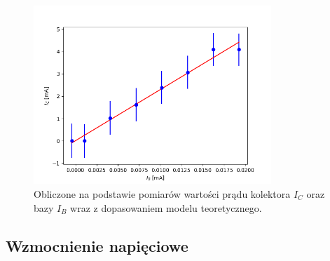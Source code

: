 \documentclass[10pt,a4paper]{article}
\begin{document}
\begin{figure}[ht!]	
	\begin{center}
		\includegraphics[width = 0.8\textwidth]{Figure_1.png}
		\caption{Obliczone na podstawie pomiarów wartości prądu kolektora $I_C$ oraz bazy $I_B$ wraz z dopasowaniem modelu teoretycznego.}
		\label{fig_1}
	\end{center}
\end{figure}	

\subsection*{Wzmocnienie napięciowe}
\end{document}
